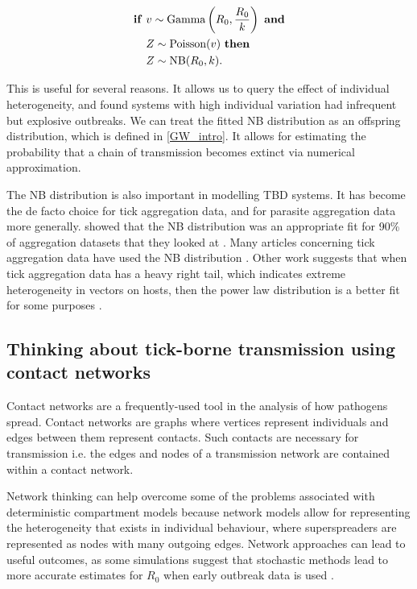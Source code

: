\documentclass[hidelinks]{article}
\begin{document}
\begin{align}\label{PoissonMixture}
	\text{\textbf{if}} \text{      } & v \sim \text{Gamma}\left(R_0, \frac{R_0}{k}\right) \text{      \textbf{and}} \nonumber \\
	\space & Z \sim \text{Poisson}(v) \text{      \textbf{then}} \\
    \space & Z \sim \text{NB}(R_0, k). \nonumber
\end{align}

This is useful for several reasons. It allows us to query the effect of individual heterogeneity, and \citet{LloydSmith2005} found systems with high individual variation had infrequent but explosive outbreaks. We can treat the fitted NB distribution as an offspring distribution, which is defined in \ref{GW_intro}. It allows for estimating the probability that a chain of transmission becomes extinct via numerical approximation.

The NB distribution is also important in modelling TBD systems. It has become the de facto choice for tick aggregation data, and for parasite aggregation data more generally. \citet{SHAW1998} showed that the NB distribution was an appropriate fit for 90\% of aggregation datasets that they looked at \citep{SHAW1998}. Many articles concerning tick aggregation data have used the NB distribution \citep{Bown2003, HARRISON2012, Brunner2008}. Other work suggests that when tick aggregation data has a heavy right tail, which indicates extreme heterogeneity in vectors on hosts, then the power law distribution is a better fit for some purposes \citep{Ferreri2014, Bisanzio2010}.

\subsection{Thinking about tick-borne transmission using contact networks}

Contact networks are a frequently-used tool in the analysis of how pathogens spread. Contact networks are graphs where vertices represent individuals and edges between them represent contacts. Such contacts are necessary for transmission i.e. the edges and nodes of a transmission network are contained within a contact network. 

Network thinking can help overcome some of the problems associated with deterministic compartment models because network models allow for representing the heterogeneity that exists in individual behaviour, where superspreaders are represented as nodes with many outgoing edges. Network approaches can lead to useful outcomes, as some simulations suggest that stochastic methods lead to more accurate estimates for $ R_0 $ when early outbreak data is used \citep{Brauer2008b}.
\end{document}
